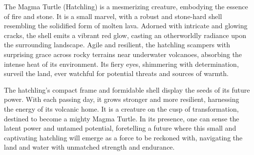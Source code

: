 \documentclass[letterpaper,openany,twoside,twocolumn]{book}
\begin{document}
The Magma Turtle (Hatchling) is a mesmerizing creature, embodying the essence of fire and stone. It is a small marvel, with a robust and stone-hard shell resembling the solidified form of molten lava. Adorned with intricate and glowing cracks, the shell emits a vibrant red glow, casting an otherworldly radiance upon the surrounding landscape. Agile and resilient, the hatchling scampers with surprising grace across rocky terrains near underwater volcanoes, absorbing the intense heat of its environment. Its fiery eyes, shimmering with determination, surveil the land, ever watchful for potential threats and sources of warmth.

The hatchling's compact frame and formidable shell display the seeds of its future power. With each passing day, it grows stronger and more resilient, harnessing the energy of its volcanic home. It is a creature on the cusp of transformation, destined to become a mighty Magma Turtle. In its presence, one can sense the latent power and untamed potential, foretelling a future where this small and captivating hatchling will emerge as a force to be reckoned \blocktextlinebreak\hspace*{2.4cm} with, navigating the land and water with \blocktextlinebreak\hspace*{3.6cm} unmatched strength and endurance.

\newpage

%
\end{document}
